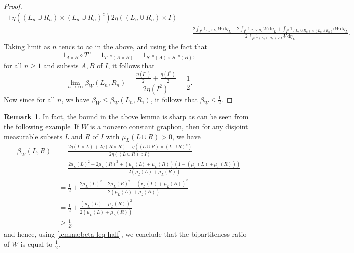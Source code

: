 \documentclass[12pt,a4paper,bold]{thesis}
\theoremstyle{definition}
\newtheorem{remark}[thm]{Remark}
\begin{document}
\begin{proof}
\begin{align*}
{        + \eta((L_n \cup R_n) \times (L_n \cup R_n)^c)}{2 \eta((L_n \cup R_n) \times I)}
        \\
        & =
        \frac{2 \int_{I^2} 1_{L_n \times L_n} W\, \mathrm{d}\eta_L 
        + 2 \int_{I^2} 1_{R_n \times R_n} W\, \mathrm{d}\eta_L
        + \int_{I^2} 1_{(L_n \cup R_n) \times (L_n \cup R_n)^c} W\, \mathrm{d}\eta_L}
        {2 \int_{I^2} 1_{(L_n \cup R_n) \times I} W\, \mathrm{d}\eta_L}.
    \end{align*}
    Taking limit as $n$ tends to $\infty$ in the above, and using the fact that 
    \begin{equation*}
        1_{A \times B} \circ T^n = 1_{T^{-n}(A \times B)} = 1_{S^{-n}(A) \times S^{-n}(B)},
    \end{equation*}
    for all $n \geq 1$ and subsets $A, B$ of $I$, it follows that
    \begin{equation*}
        \lim_{n \to \infty} \beta_W(L_n,R_n)
        = \frac{\frac{\eta(I^2)}{2} + \frac{\eta(I^2)}{2}}{2 \eta(I^2)} = \frac{1}{2}.
    \end{equation*}
    Now since for all $n$, we have $\beta_W \leq \beta_W(L_n,R_n)$, it follows that
    $\beta_W \leq \frac{1}{2}$.
\end{proof}

\begin{remark}
    In fact, the bound in the above lemma is sharp as can be seen from the following example. 
    If $W$ is a nonzero constant graphon, then for any disjoint measurable subsets
    $L$ and $R$ of $I$ with $\mu_L(L \cup R) > 0$, we have
    \begin{align*}
        \beta_W(L,R) \
        & =
        \frac{2 \eta(L \times L) + 2 \eta(R \times R) + \eta((L \cup R) \times (L \cup R)^c)}
        {2 \eta((L \cup R) \times I)}
        \\
        & =
        \frac{2 \mu_L(L)^2 + 2 \mu_L(R)^2 + (\mu_L(L) + \mu_L(R)) (1 - (\mu_L(L) + \mu_L(R)))}
        {2 (\mu_L(L) + \mu_L(R))}
        \\
        & =
        \frac{1}{2} + \frac{2 \mu_L(L)^2 + 2 \mu_L(R)^2 - (\mu_L(L) + \mu_L(R))^2}
        {2 (\mu_L(L) + \mu_L(R))}
        \\
        & =
        \frac{1}{2} + \frac{(\mu_L(L) - \mu_L(R))^2}{2 (\mu_L(L) + \mu_L(R))}
        \\
        & \geq \frac{1}{2},
    \end{align*} 
    and hence, using \cref{lemma:beta-leq-half}, we conclude that 
    the bipartiteness ratio of $W$ is equal to $\frac{1}{2}$.
\end{remark}
\end{document}
